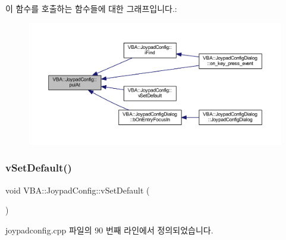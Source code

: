 이 함수를 호출하는 함수들에 대한 그래프입니다.\+:
\nopagebreak
\begin{figure}[H]
\begin{center}
\leavevmode
\includegraphics[width=350pt]{class_v_b_a_1_1_joypad_config_afa304227fa214176c874619365ffc445_icgraph}
\end{center}
\end{figure}
\mbox{\label{class_v_b_a_1_1_joypad_config_af9f282b555d910519ce2fa03d5c66dda}} 
\subsubsection{\texorpdfstring{v\+Set\+Default()}{vSetDefault()}}
{\footnotesize\ttfamily void V\+B\+A\+::\+Joypad\+Config\+::v\+Set\+Default (\begin{DoxyParamCaption}{ }\end{DoxyParamCaption})}



joypadconfig.\+cpp 파일의 90 번째 라인에서 정의되었습니다.


